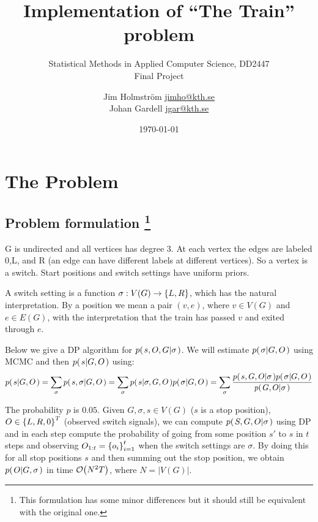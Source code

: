 \documentclass[a4paper,11pt]{kth-mag}
\title{Implementation of ``The Train'' problem}
\subtitle{Statistical Methods in Applied Computer Science, DD2447\\ Final Project}
\author{
    Jim Holmstr\"{o}m \href{mailto:jimho@kth.se}{jimho@kth.se}\\
    Johan Gardell \href{mailto:jgar@kth.se}{jgar@kth.se}
}
\date{\today}
\begin{document}
    \frontmatter
    \pagestyle{empty}
    \removepagenumbers
    \maketitle
    \tableofcontents*
    \mainmatter
    \pagestyle{newchap}

    \chapter{The Problem}
        \section[problemformulation]{
            Problem formulation 
            \footnote{
                This formulation has some minor differences but it should still 
                be equivalent with the original one.
            }
        }
        G is undirected and all vertices has degree 3. At each vertex the edges
        are labeled 0,L, and R (an edge can have different labels at different
        vertices). So a vertex is a switch. Start positions and switch settings
        have uniform priors.

        A switch setting is a function $\sigma: V(G)\rightarrow\left\{{L,R}\right\}$, which
        has the natural interpretation. By a position we mean a pair $(v,e)$,
        where $v\in V(G)$ and $e\in E(G)$, with the interpretation that the
        train has passed $v$ and exited through $e$.

        Below we give a DP algorithm for $p{(\left. s,O,G \middle\vert \sigma \right.)}$. We will
        estimate $p{(\left. \sigma \middle\vert G,O \right.)}$ using MCMC and then $p{(\left. s \middle\vert G,O \right.)}$
        using:
        \begin{equation}
            p{(\left. s \middle\vert G,O \right.)} 
            = \sum\limits_\sigma
                p{(\left. s,\sigma \middle\vert G,O \right.)}
            = \sum\limits_\sigma
                p{(\left. s \middle\vert \sigma,G,O \right.)}p{(\left. \sigma \middle\vert G,O \right.)}
            = \sum\limits_\sigma
                \frac{
                    p{(\left. s,G,O \middle\vert \sigma \right.)}p{(\left. \sigma \middle\vert G,O \right.)}
                }{
                    p{(\left. G,O \middle\vert \sigma \right.)}
                }
        \end{equation}

    The probability $p$ is $0.05$. Given $G,\sigma,s\in V(G)$ ($s$ is a stop
    position), $O\in\left\{{L,R,0}\right\}^T$ (observed switch signals), we can compute 
    $p{(\left. S,G,O \middle\vert \sigma \right.)}$ using DP and in each step compute the probability
    of going from some position $s'$ to $s$ in $t$ steps and observing
    $O_{1:t}=\left\{{o_i}\right\}_{i=1}^t$ when the switch settings are $\sigma$. By doing this
    for all stop positions $s$ and then summing out the stop position, we
    obtain $p{(\left. O \middle\vert G,\sigma \right.)}$ in time $\mathcal{O}{\left(N^2T\right)}$, where $N=|V(G)|$.
\end{document}
